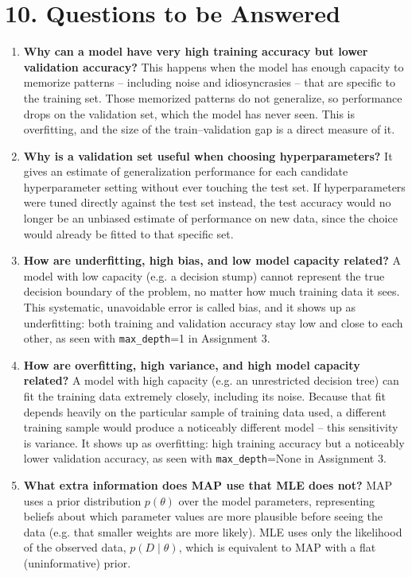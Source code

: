 \documentclass[12pt,a4paper]{article}
\begin{document}
\section*{10. Questions to be Answered}

\begin{enumerate}[leftmargin=1.6em]
\item \textbf{Why can a model have very high training accuracy but lower validation accuracy?} This happens when the model has enough capacity to memorize patterns -- including noise and idiosyncrasies -- that are specific to the training set. Those memorized patterns do not generalize, so performance drops on the validation set, which the model has never seen. This is overfitting, and the size of the train--validation gap is a direct measure of it.

\item \textbf{Why is a validation set useful when choosing hyperparameters?} It gives an estimate of generalization performance for each candidate hyperparameter setting without ever touching the test set. If hyperparameters were tuned directly against the test set instead, the test accuracy would no longer be an unbiased estimate of performance on new data, since the choice would already be fitted to that specific set.

\item \textbf{How are underfitting, high bias, and low model capacity related?} A model with low capacity (e.g. a decision stump) cannot represent the true decision boundary of the problem, no matter how much training data it sees. This systematic, unavoidable error is called bias, and it shows up as underfitting: both training and validation accuracy stay low and close to each other, as seen with \texttt{max\_depth}=1 in Assignment 3.

\item \textbf{How are overfitting, high variance, and high model capacity related?} A model with high capacity (e.g. an unrestricted decision tree) can fit the training data extremely closely, including its noise. Because that fit depends heavily on the particular sample of training data used, a different training sample would produce a noticeably different model -- this sensitivity is variance. It shows up as overfitting: high training accuracy but a noticeably lower validation accuracy, as seen with \texttt{max\_depth}=None in Assignment 3.

\item \textbf{What extra information does MAP use that MLE does not?} MAP uses a prior distribution $p(\theta)$ over the model parameters, representing beliefs about which parameter values are more plausible before seeing the data (e.g. that smaller weights are more likely). MLE uses only the likelihood of the observed data, $p(D\mid\theta)$, which is equivalent to MAP with a flat (uninformative) prior.


\end{enumerate}
\end{document}
